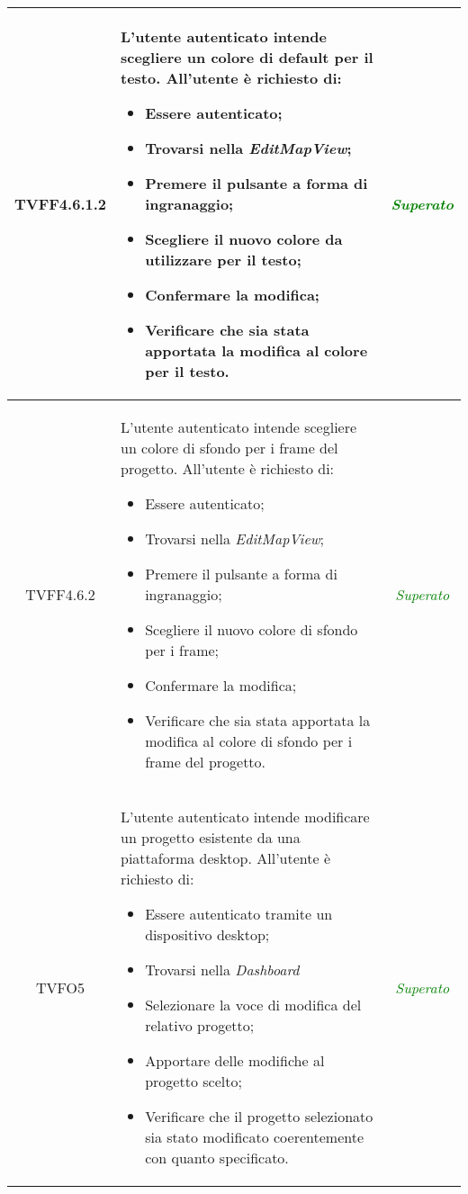 \begin{longtable}{|c|>{}m{8cm}|c|}
\hypertarget{TVFF4.6.1.2}{TVFF4.6.1.2} & L'utente autenticato intende scegliere un colore di default per il testo.
All'utente è richiesto di:
\begin{itemize}
	\item Essere autenticato;
	\item Trovarsi nella \textit{EditMapView};
	\item Premere il pulsante a forma di ingranaggio;
	\item Scegliere il nuovo colore da utilizzare per il testo;
	\item Confermare la modifica;
	\item Verificare che sia stata apportata la modifica al colore per il testo.
\end{itemize} & \textcolor{Green}{\textit{Superato}}\\ \hline
\hypertarget{TVFF4.6.2}{TVFF4.6.2} &  L'utente autenticato intende scegliere un colore di sfondo per i frame del progetto.
All'utente è richiesto di:
\begin{itemize}
	\item Essere autenticato;
	\item Trovarsi nella \textit{EditMapView};
	\item Premere il pulsante a forma di ingranaggio;
	\item Scegliere il nuovo colore di sfondo per i frame;
	\item Confermare la modifica;
	\item Verificare che sia stata apportata la modifica al colore di sfondo per i frame del progetto.
\end{itemize} & \textcolor{Green}{\textit{Superato}}\\ \hline
\hypertarget{TVFO5}{TVFO5} & L'utente autenticato intende modificare un progetto esistente da una piattaforma desktop.
All'utente è richiesto di:
\begin{itemize}
	\item Essere autenticato tramite un dispositivo desktop;
	\item Trovarsi nella \textit{Dashboard}
	\item Selezionare la voce di modifica del relativo progetto;
	\item Apportare delle modifiche al progetto scelto;
	\item Verificare che il progetto selezionato sia stato modificato coerentemente con quanto specificato.
\end{itemize} & \textcolor{Green}{\textit{Superato}}\\ \hline

\end{longtable}
